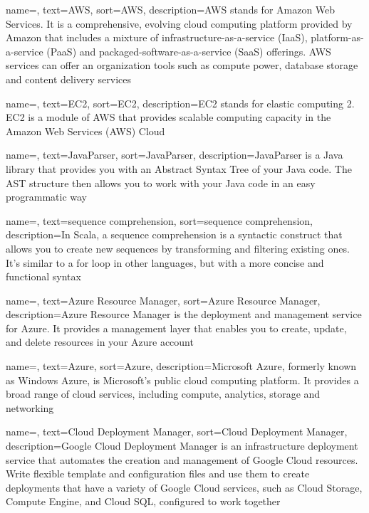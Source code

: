 {
    name=,
    text=AWS,
    sort=AWS,
    description={AWS stands for Amazon Web Services. It is a comprehensive, evolving cloud computing platform provided by Amazon that includes a mixture of infrastructure-as-a-service (IaaS), platform-as-a-service (PaaS) and packaged-software-as-a-service (SaaS) offerings. AWS services can offer an organization tools such as compute power, database storage and content delivery services}
}


{
    name=,
    text=EC2,
    sort=EC2,
    description={EC2 stands for elastic computing 2. EC2 is a module of AWS that provides scalable computing capacity in the Amazon Web Services (AWS) Cloud }
}

{
    name=,
    text=JavaParser,
    sort=JavaParser,
    description={JavaParser is a Java library that provides you with an Abstract Syntax Tree of your Java code. The AST structure then allows you to work with your Java code in an easy programmatic way}
}

{
    name=,
    text=sequence comprehension,
    sort=sequence comprehension,
    description={In Scala, a sequence comprehension is a syntactic construct that allows you to create new sequences by transforming and filtering existing ones. It's similar to a for loop in other languages, but with a more concise and functional syntax }
}

{
    name=,
    text=Azure Resource Manager,
    sort=Azure Resource Manager,
    description={Azure Resource Manager is the deployment and management service for Azure. It provides a management layer that enables you to create, update, and delete resources in your Azure account
    }
}

{
    name=,
    text=Azure,
    sort=Azure,
    description={Microsoft Azure, formerly known as Windows Azure, is Microsoft's public cloud computing platform. It provides a broad range of cloud services, including compute, analytics, storage and networking}
}

{
    name=,
    text=Cloud Deployment Manager,
    sort=Cloud Deployment Manager,
    description={Google Cloud Deployment Manager is an infrastructure deployment service that automates the creation and management of Google Cloud resources. Write flexible template and configuration files and use them to create deployments that have a variety of Google Cloud services, such as Cloud Storage, Compute Engine, and Cloud SQL, configured to work together}
}

